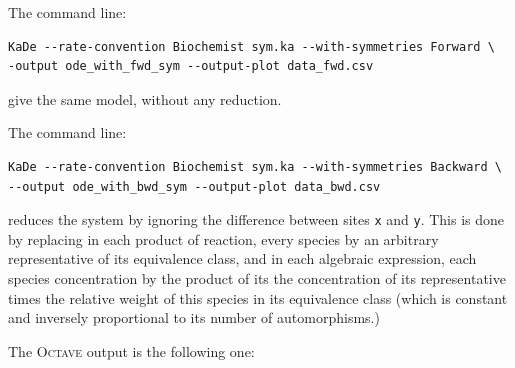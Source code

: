 \documentclass[11pt]{book}
\begin{document}
The command line:
\begin{verbatim}
KaDe --rate-convention Biochemist sym.ka --with-symmetries Forward \
-output ode_with_fwd_sym --output-plot data_fwd.csv
\end{verbatim}
give the same model, without any reduction.

The command line:
\begin{verbatim}
KaDe --rate-convention Biochemist sym.ka --with-symmetries Backward \
--output ode_with_bwd_sym --output-plot data_bwd.csv
\end{verbatim}
reduces the system by ignoring the difference between sites \texttt{x} and \texttt{y}. This is done by replacing in each product of reaction, every species by an arbitrary representative of its equivalence class, and in each algebraic expression, each species concentration by the product of its the concentration of its representative times the relative weight of this species in its equivalence class (which is constant and inversely proportional to its number of automorphisms.)

The \textsc{Octave} output is the following one:
\end{document}
